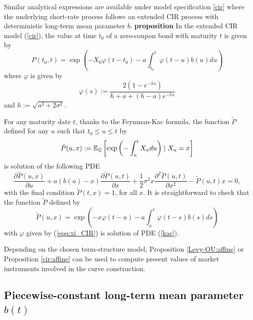 Similar analytical expressions are available under model specification \ref{cir} where the underlying short-rate process follows an extended CIR process with deterministic long-term mean parameter $b$.%
\textbf{proposition}
\label{cir:affine}
In the extended CIR model (\ref{cir}), the value at time $t_0$ of a zero-coupon bond with maturity $t$ is given by
\begin{equation}
\label{feyn}
P(t_0,t) =\exp\left(-X_0\varphi(t-t_0 ) -a \int_{t_0}^t \varphi(t-u  ) b(u) du\right)
\end{equation}
where $\varphi $ is given by 
\begin{equation}
\label{eqq:xi_CIR}
\varphi(s):=\frac{2(1-e^{-hs})}{h+a + (h-a)e^{-hs}} 
\end{equation}
and $h := \sqrt{a^2 + 2\sigma^2}.$

\proof
For any maturity date $t$, thanks to the Feynman-Kac formula, the function $\tilde{P}$ defined for any $u$ such that $t_0\leq u \leq t$ by
$$
\tilde{P}(u,x) := \mathbb{E}_{\mathbb{Q}}\left[ \exp\left(-\int_{u}^t{ X_u du}\right) \mid X_u = x\right]
$$
is solution of the following PDE
\begin{equation}
\label{kac}
 \frac{\partial \tilde{P}(u,x)}{\partial u} + a\left( b(u)-x\right)\frac{\partial \tilde{P}(u,t)}{\partial x} +\frac{1}{2}\sigma^2x\frac{\partial^2\tilde{P}(u,t)}{\partial x^2} - \tilde{P}(u,t)x=0,
\end{equation}
with the final condition $\tilde{P}(t, x)=1$, for all $x$. It is straightforward to check that the function $\tilde{P}$ defined by
$$
\tilde{P}(u,x) =\exp\left(-x\varphi(t-u ) -a \int_{u}^t \varphi(t-s  ) b(s) ds\right)
$$
with $\varphi $ given by  (\ref{eqq:xi_CIR}) is solution of PDE (\ref{kac}).

\finproof


Depending on the chosen term-structure model, Proposition \ref{Levy-OU:affine} or Proposition \ref{cir:affine} can be used to compute  present values of market instruments involved in the curve construction. 

\subsection{Piecewise-constant long-term mean parameter $b(t)$}
\label{calibr_bi}

